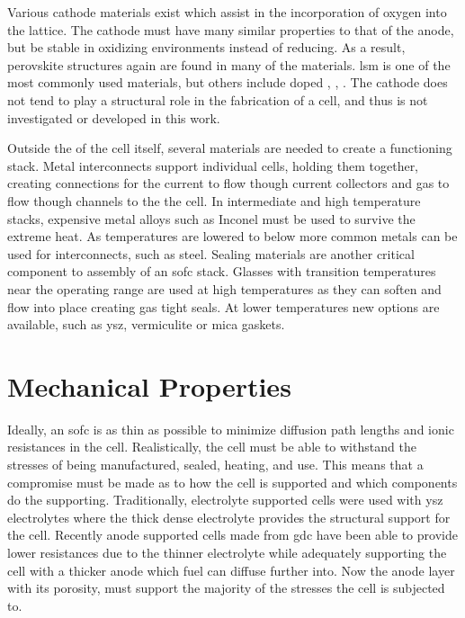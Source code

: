     Various cathode materials exist which assist in the incorporation of oxygen into the lattice.
    The cathode must have many similar properties to that of the anode, but be stable in oxidizing environments instead of reducing.
    As a result, perovskite structures again are found in many of the materials.
    \Gls{lsm} is one of the most commonly used materials, but others include doped , , . \cite{Minh2004, Cascos2016, Chen2015, Kuhn2013}
    The cathode does not tend to play a structural role in the fabrication of a cell, and thus is not investigated or developed in this work.

    Outside the of the cell itself, several materials are needed to create a functioning stack.
    Metal interconnects support individual cells, holding them together, creating connections for the current to flow though current collectors and gas to flow though channels to the the cell.
    In intermediate and high temperature stacks, expensive metal alloys such as Inconel must be used to survive the extreme heat.
    As temperatures are lowered to below  more common metals can be used for interconnects, such as steel.
    Sealing materials are another critical component to assembly of an \gls{sofc} stack.
    Glasses with transition temperatures near the operating range are used at high temperatures as they can soften and flow into place creating gas tight seals.
    At lower temperatures new options are available, such as \gls{ysz}, vermiculite or mica gaskets.%

\section{Mechanical Properties}
    Ideally, an \gls{sofc} is as thin as possible to minimize diffusion path lengths and ionic resistances in the cell.\cite{Chan2001}
    Realistically, the cell must be able to withstand the stresses of being manufactured, sealed, heating, and use.
    This means that a compromise must be made as to how the cell is supported and which components do the supporting.
    Traditionally, electrolyte supported cells were used with \gls{ysz} electrolytes where the thick dense electrolyte provides the structural support for the cell.
    Recently anode supported cells made from \gls{gdc} have been able to provide lower resistances due to the thinner electrolyte while adequately supporting the cell with a thicker anode which fuel can diffuse further into.\cite{Fleischhauer2014a,Laurencin2008}
    Now the anode layer with its porosity, must support the majority of the stresses the cell is subjected to.

